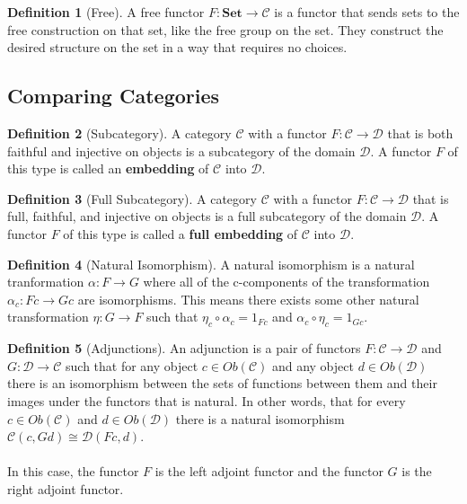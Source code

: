 \documentclass{article}
\theoremstyle{definition}
\newtheorem{definition}{Definition}
\begin{document}
\begin{definition}[Free]
    A free functor $F:\mathbf{Set}\rightarrow\mathcal{C}$ is a functor that sends sets to the free construction on that set, like the free group on the set.
    They construct the desired structure on the set in a way that requires no choices.
\end{definition}



\subsection*{Comparing Categories}

\begin{definition}[Subcategory]
    A category $\mathcal{C}$ with a functor $F:\mathcal{C}\rightarrow\mathcal{D}$ that is both faithful and injective on objects is a subcategory of the domain $\mathcal{D}$.
    A functor $F$ of this type is called an \textbf{embedding} of $\mathcal{C}$ into $\mathcal{D}$.
\end{definition}


\begin{definition}[Full Subcategory]
    A category $\mathcal{C}$ with a functor $F:\mathcal{C}\rightarrow\mathcal{D}$ that is full, faithful, and injective on objects is a full subcategory of the domain $\mathcal{D}$.
    A functor $F$ of this type is called a \textbf{full embedding} of $\mathcal{C}$ into $\mathcal{D}$.
\end{definition}


\begin{definition}[Natural Isomorphism]
    A natural isomorphism is a natural tranformation $\alpha:F\rightarrow G$ where all of the c-components of the transformation $\alpha_{c}:Fc\rightarrow Gc$ are isomorphisms.
    This means there exists some other natural transformation $\eta:G\rightarrow F$ such that $\eta_c\circ\alpha_c = 1_{Fc}$ and $\alpha_c\circ\eta_c = 1_{Gc}$.
\end{definition}

\color{blue}
\begin{definition}[Adjunctions]
    An adjunction is a pair of functors $F:\mathcal{C}\rightarrow\mathcal{D}$ and $G:\mathcal{D}\rightarrow\mathcal{C}$ such that for any object $c\in Ob(\mathcal{C})$ and any object $d\in Ob(\mathcal{D})$ there is an isomorphism between the sets of functions between them and their images under the functors that is natural.
    In other words, that for every $c\in Ob(\mathcal{C})$ and $d\in Ob(\mathcal{D})$ there is a natural isomorphism $\mathcal{C}(c,Gd)\cong\mathcal{D}(Fc,d)$.\\\\
    In this case, the functor $F$ is the left adjoint functor and the functor $G$ is the right adjoint functor.
\end{definition}
\color{black}
\end{document}

